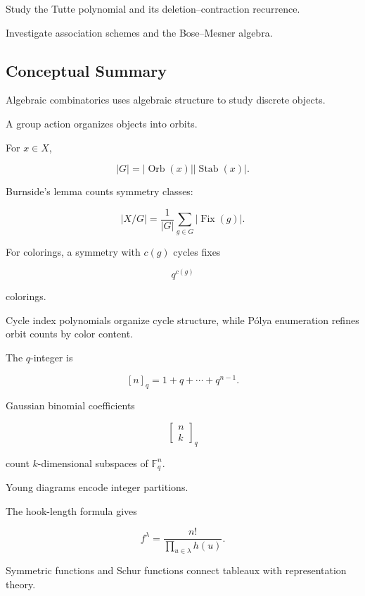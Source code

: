 \begin{exercise}[4]
Study the Tutte polynomial and its deletion--contraction recurrence.
\end{exercise}

\begin{exercise}[4]
Investigate association schemes and the Bose--Mesner algebra.
\end{exercise}

\subsection{Conceptual Summary}
\label{subsec:algebraic-combinatorics-summary}

Algebraic combinatorics uses algebraic structure to study discrete
objects.

A group action organizes objects into orbits.

For \(x\in X\),

\[
\boxed{
|G|
=
|\operatorname{Orb}(x)|
|\operatorname{Stab}(x)|.
}
\]

Burnside's lemma counts symmetry classes:

\[
\boxed{
|X/G|
=
\frac1{|G|}
\sum_{g\in G}
|\operatorname{Fix}(g)|.
}
\]

For colorings, a symmetry with \(c(g)\) cycles fixes

\[
\boxed{
q^{c(g)}
}
\]

colorings.

Cycle index polynomials organize cycle structure, while P\'olya
enumeration refines orbit counts by color content.

The \(q\)-integer is

\[
\boxed{
[n]_q
=
1+q+\cdots+q^{n-1}.
}
\]

Gaussian binomial coefficients

\[
\boxed{
\begin{bmatrix}
n\\
k
\end{bmatrix}_q
}
\]

count \(k\)-dimensional subspaces of \(\mathbb{F}_q^n\).

Young diagrams encode integer partitions.

The hook-length formula gives

\[
\boxed{
f^\lambda
=
\frac{n!}{
\prod_{u\in\lambda}h(u)
}.
}
\]

Symmetric functions and Schur functions connect tableaux with
representation theory.


